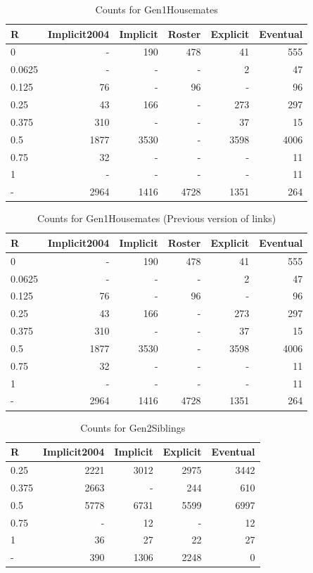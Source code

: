 \documentclass[a4paper]{article}\usepackage[]{graphicx}\usepackage[]{color}
\begin{document}
\begin{table}[ht]
\centering
{\large
\begin{tabular}{lrrrrr}
  \hline
R & Implicit2004 & Implicit & Roster & Explicit & Eventual \\ 
  \hline
0 & - & 190 & 478 &  41 & 555 \\ 
  0.0625 & - & - & - &   2 &  47 \\ 
  0.125 &  76 & - &  96 & - &  96 \\ 
  0.25 &  43 & 166 & - & 273 & 297 \\ 
  0.375 & 310 & - & - &  37 &  15 \\ 
  0.5 & 1877 & 3530 & - & 3598 & 4006 \\ 
  0.75 &  32 & - & - & - &  11 \\ 
  1 & - & - & - & - &  11 \\ 
  - & 2964 & 1416 & 4728 & 1351 & 264 \\ 
   \hline
\end{tabular}
}
\caption{Counts for Gen1Housemates} 
\end{table}
\begin{table}[ht]
\centering
{\large
\begin{tabular}{lrrrrr}
  \hline
R & Implicit2004 & Implicit & Roster & Explicit & Eventual \\ 
  \hline
0 & - & 190 & 478 &  41 & 555 \\ 
  0.0625 & - & - & - &   2 &  47 \\ 
  0.125 &  76 & - &  96 & - &  96 \\ 
  0.25 &  43 & 166 & - & 273 & 297 \\ 
  0.375 & 310 & - & - &  37 &  15 \\ 
  0.5 & 1877 & 3530 & - & 3598 & 4006 \\ 
  0.75 &  32 & - & - & - &  11 \\ 
  1 & - & - & - & - &  11 \\ 
  - & 2964 & 1416 & 4728 & 1351 & 264 \\ 
   \hline
\end{tabular}
}
\caption{Counts for Gen1Housemates (Previous version of links)} 
\end{table}
\begin{table}[ht]
\centering
{\large
\begin{tabular}{lrrrr}
  \hline
R & Implicit2004 & Implicit & Explicit & Eventual \\ 
  \hline
0.25 & 2221 & 3012 & 2975 & 3442 \\ 
  0.375 & 2663 & - & 244 & 610 \\ 
  0.5 & 5778 & 6731 & 5599 & 6997 \\ 
  0.75 & - &  12 & - &  12 \\ 
  1 &  36 &  27 &  22 &  27 \\ 
  - & 390 & 1306 & 2248 &   0 \\ 
   \hline
\end{tabular}
}
\caption{Counts for Gen2Siblings} 
\end{table}
\end{document}
